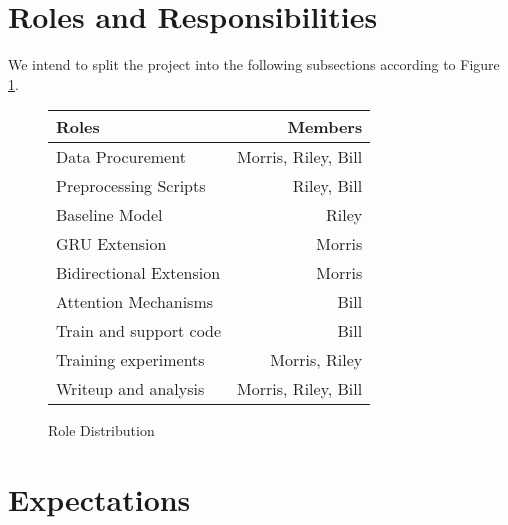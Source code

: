 \documentclass[twoside,twocolumn]{article}
\begin{document}
\section{Roles and Responsibilities}
We intend to split the project into the following subsections according to Figure \ref{fig:roles}.

\begin{figure}
  \centering
  \begin{tabular}{ |l|r| }
      \hline
      \textbf{Roles} & \textbf{Members} \\
      \hline
      Data Procurement & Morris, Riley, Bill \\ \hline
      Preprocessing Scripts & Riley, Bill \\ \hline
      Baseline Model & Riley \\ \hline
      GRU Extension & Morris \\ \hline
      Bidirectional Extension & Morris \\ \hline
      Attention Mechanisms & Bill \\ \hline
      Train and support code & Bill \\ \hline
      Training experiments & Morris, Riley \\ \hline
      Writeup and analysis & Morris, Riley, Bill \\ \hline
  \end{tabular}
  \caption{Role Distribution}
  \label{fig:roles}
\end{figure}

\section{Expectations}



\end{document}
